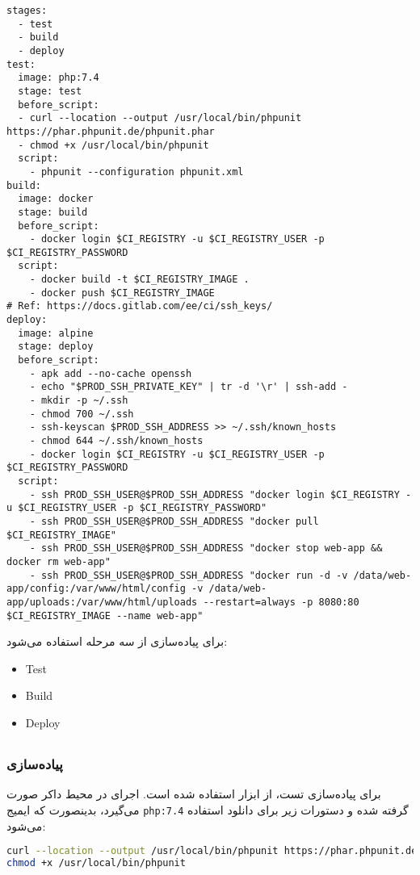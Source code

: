  
\begin{latin}
\begin{lstlisting}
stages:
  - test
  - build
  - deploy
test:
  image: php:7.4
  stage: test
  before_script:
  - curl --location --output /usr/local/bin/phpunit https://phar.phpunit.de/phpunit.phar
  - chmod +x /usr/local/bin/phpunit
  script:
    - phpunit --configuration phpunit.xml
build:
  image: docker
  stage: build
  before_script:
    - docker login $CI_REGISTRY -u $CI_REGISTRY_USER -p $CI_REGISTRY_PASSWORD
  script:
    - docker build -t $CI_REGISTRY_IMAGE .
    - docker push $CI_REGISTRY_IMAGE
# Ref: https://docs.gitlab.com/ee/ci/ssh_keys/
deploy:
  image: alpine
  stage: deploy
  before_script:
    - apk add --no-cache openssh
    - echo "$PROD_SSH_PRIVATE_KEY" | tr -d '\r' | ssh-add -
    - mkdir -p ~/.ssh
    - chmod 700 ~/.ssh  
    - ssh-keyscan $PROD_SSH_ADDRESS >> ~/.ssh/known_hosts
    - chmod 644 ~/.ssh/known_hosts
    - docker login $CI_REGISTRY -u $CI_REGISTRY_USER -p $CI_REGISTRY_PASSWORD
  script:
    - ssh PROD_SSH_USER@$PROD_SSH_ADDRESS "docker login $CI_REGISTRY -u $CI_REGISTRY_USER -p $CI_REGISTRY_PASSWORD"
    - ssh PROD_SSH_USER@$PROD_SSH_ADDRESS "docker pull $CI_REGISTRY_IMAGE"
    - ssh PROD_SSH_USER@$PROD_SSH_ADDRESS "docker stop web-app && docker rm web-app"
    - ssh PROD_SSH_USER@$PROD_SSH_ADDRESS "docker run -d -v /data/web-app/config:/var/www/html/config -v /data/web-app/uploads:/var/www/html/uploads --restart=always -p 8080:80 $CI_REGISTRY_IMAGE --name web-app"
\end{lstlisting}
\end{latin}

\newpage

برای پیاده‌سازی از سه مرحله استفاده می‌شود:
\begin{latin}
\begin{itemize}
\item
Test
\item
Build
\item
Deploy
\end{itemize}
\end{latin}


\subsection{ }
\subsubsection{پیاده‌سازی }
برای پیاده‌سازی تست، از ابزار
استفاده شده است.
اجرای
در محیط داکر صورت می‌گیرد، بدینصورت که 
ایمیج 
\texttt{php:7.4}
گرفته شده و دستورات زیر برای دانلود 
استفاده می‌شود:
\begin{latin}
\begin{lstlisting}[language=Bash]
curl --location --output /usr/local/bin/phpunit https://phar.phpunit.de/phpunit.phar
chmod +x /usr/local/bin/phpunit
\end{lstlisting}
\end{latin}

